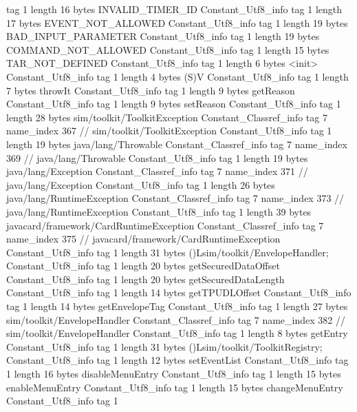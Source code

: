 {{{			tag	1
			length	16
			bytes	INVALID_TIMER_ID
		}
		Constant_Utf8_info {
			tag	1
			length	17
			bytes	EVENT_NOT_ALLOWED
		}
		Constant_Utf8_info {
			tag	1
			length	19
			bytes	BAD_INPUT_PARAMETER
		}
		Constant_Utf8_info {
			tag	1
			length	19
			bytes	COMMAND_NOT_ALLOWED
		}
		Constant_Utf8_info {
			tag	1
			length	15
			bytes	TAR_NOT_DEFINED
		}
		Constant_Utf8_info {
			tag	1
			length	6
			bytes	<init>
		}
		Constant_Utf8_info {
			tag	1
			length	4
			bytes	(S)V
		}
		Constant_Utf8_info {
			tag	1
			length	7
			bytes	throwIt
		}
		Constant_Utf8_info {
			tag	1
			length	9
			bytes	getReason
		}
		Constant_Utf8_info {
			tag	1
			length	9
			bytes	setReason
		}
		Constant_Utf8_info {
			tag	1
			length	28
			bytes	sim/toolkit/ToolkitException
		}
		Constant_Classref_info {
			tag	7
			name_index	367		// sim/toolkit/ToolkitException
		}
		Constant_Utf8_info {
			tag	1
			length	19
			bytes	java/lang/Throwable
		}
		Constant_Classref_info {
			tag	7
			name_index	369		// java/lang/Throwable
		}
		Constant_Utf8_info {
			tag	1
			length	19
			bytes	java/lang/Exception
		}
		Constant_Classref_info {
			tag	7
			name_index	371		// java/lang/Exception
		}
		Constant_Utf8_info {
			tag	1
			length	26
			bytes	java/lang/RuntimeException
		}
		Constant_Classref_info {
			tag	7
			name_index	373		// java/lang/RuntimeException
		}
		Constant_Utf8_info {
			tag	1
			length	39
			bytes	javacard/framework/CardRuntimeException
		}
		Constant_Classref_info {
			tag	7
			name_index	375		// javacard/framework/CardRuntimeException
		}
		Constant_Utf8_info {
			tag	1
			length	31
			bytes	()Lsim/toolkit/EnvelopeHandler;
		}
		Constant_Utf8_info {
			tag	1
			length	20
			bytes	getSecuredDataOffset
		}
		Constant_Utf8_info {
			tag	1
			length	20
			bytes	getSecuredDataLength
		}
		Constant_Utf8_info {
			tag	1
			length	14
			bytes	getTPUDLOffset
		}
		Constant_Utf8_info {
			tag	1
			length	14
			bytes	getEnvelopeTag
		}
		Constant_Utf8_info {
			tag	1
			length	27
			bytes	sim/toolkit/EnvelopeHandler
		}
		Constant_Classref_info {
			tag	7
			name_index	382		// sim/toolkit/EnvelopeHandler
		}
		Constant_Utf8_info {
			tag	1
			length	8
			bytes	getEntry
		}
		Constant_Utf8_info {
			tag	1
			length	31
			bytes	()Lsim/toolkit/ToolkitRegistry;
		}
		Constant_Utf8_info {
			tag	1
			length	12
			bytes	setEventList
		}
		Constant_Utf8_info {
			tag	1
			length	16
			bytes	disableMenuEntry
		}
		Constant_Utf8_info {
			tag	1
			length	15
			bytes	enableMenuEntry
		}
		Constant_Utf8_info {
			tag	1
			length	15
			bytes	changeMenuEntry
		}
		Constant_Utf8_info {
			tag	1
}}}

